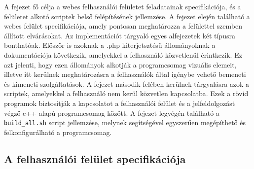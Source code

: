 \documentclass[oneside,titlepage,12pt,a4paper]{report}
\begin{document}
A fejezet fő célja a webes felhasználói felületet feladatainak specifikációja, és a felületet alkotó scriptek belső felépítésének jellemzése. A fejezet elején található a webes felület specifikációja, amely pontosan meghatározza a felülettel szemben állított elvárásokat. Az implementációt tárgyaló egyes alfejezetek két típusra bonthatóak. Először is azoknak a .php kiterjetsztésű állományoknak a dokumentációja következik, amelyekkel a felhasználó közvetlenül érintkezik. Ez azt jelenti, hogy ezen állományok alkotják a programcsomag vizuális elemeit, illetve itt kerülnek meghatározásra a felhasználók által igénybe vehető bemeneti és kimeneti szolgáltatások. A fejezet második felében kerülnek tárgyalásra azok a scriptek, amelyekkel a felhasználó nem kerül közvetlen kapcsolatba. Ezek a rövid programok biztosítják a kapcsolatot a felhasználói felület és a jelfeldolgozást végző c++ alapú programcsomag között. A fejezet legvégén található a \texttt{build\_all.sh} script jellemzése, melynek segítségével egyszerűen megépíthető és felkonfigurálható a programcsomag. 

\subsection{A felhasználói felület specifikációja}
\end{document}

